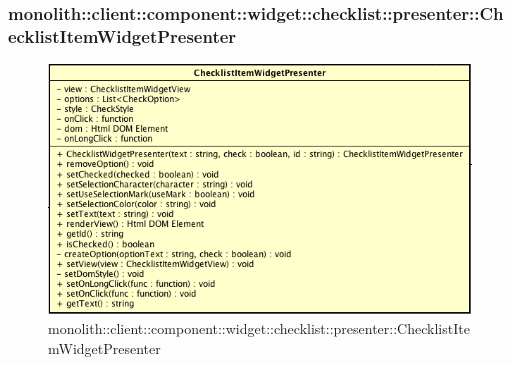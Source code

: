 \subsubsection{monolith::client::component::widget::checklist::presenter::ChecklistItemWidgetPresenter}

\label{monolith::client::component::widget::checklist::presenter::ChecklistItemWidgetPresenter}
\begin{figure}[H]
	\centering
	\includegraphics[scale=0.5]{Sezioni/SottosezioniST/img/ChecklistItemWidgetPresenter.png}
	\caption{monolith::client::component::widget::checklist::presenter::ChecklistItemWidgetPresenter}
\end{figure}

